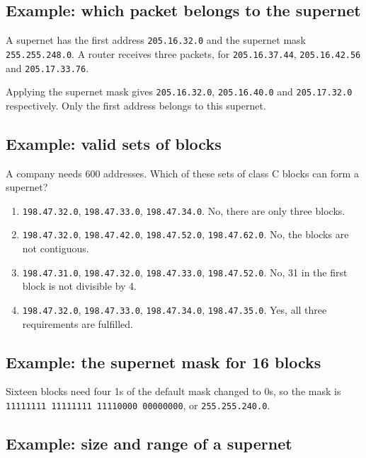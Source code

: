 \documentclass[11pt,a4paper]{article}
\begin{document}
\subsection*{Example: which packet belongs to the supernet}

A supernet has the first address \texttt{205.16.32.0} and the supernet mask
\texttt{255.255.248.0}. A router receives three packets, for \texttt{205.16.37.44},
\texttt{205.16.42.56} and \texttt{205.17.33.76}.

Applying the supernet mask gives \texttt{205.16.32.0}, \texttt{205.16.40.0} and
\texttt{205.17.32.0} respectively. Only the first address belongs to this supernet.

\subsection*{Example: valid sets of blocks}

A company needs 600 addresses. Which of these sets of class C blocks can form a supernet?

\begin{enumerate}\itemsep2pt
  \item \texttt{198.47.32.0}, \texttt{198.47.33.0}, \texttt{198.47.34.0}. No, there are only
        three blocks.
  \item \texttt{198.47.32.0}, \texttt{198.47.42.0}, \texttt{198.47.52.0}, \texttt{198.47.62.0}.
        No, the blocks are not contiguous.
  \item \texttt{198.47.31.0}, \texttt{198.47.32.0}, \texttt{198.47.33.0}, \texttt{198.47.52.0}.
        No, 31 in the first block is not divisible by 4.
  \item \texttt{198.47.32.0}, \texttt{198.47.33.0}, \texttt{198.47.34.0}, \texttt{198.47.35.0}.
        Yes, all three requirements are fulfilled.
\end{enumerate}

\subsection*{Example: the supernet mask for 16 blocks}

Sixteen blocks need four 1s of the default mask changed to 0s, so the mask is
\texttt{11111111 11111111 11110000 00000000}, or \texttt{255.255.240.0}.

\subsection*{Example: size and range of a supernet}
\end{document}
